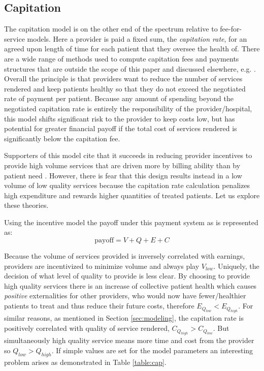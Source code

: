 \documentclass{article}
\begin{document}
\subsection{Capitation} \label{sec:capitation}
The capitation model is on the other end of the spectrum relative to fee-for-service models. Here a provider is paid a fixed sum, the \emph{capitation rate}, for an agreed upon length of time for each patient that they oversee the health of. There are a wide range of methods used to compute capitation fees and payments structures that are outside the scope of this paper and discussed elsewhere, e.g. \cite{capfees}. Overall the principle is that providers want to reduce the number of services rendered and keep patients healthy so that they do not exceed the negotiated rate of payment per patient. Because any amount of spending beyond the negotiated capitation rate is entirely the responsibility of the provider/hospital, this model shifts significant risk to the provider to keep costs low, but has potential for greater financial payoff if the total cost of services rendered is significantly below the capitation fee.

Supporters of this model cite that it succeeds in reducing provider incentives to provide high volume services that are driven more by billing ability than by patient need \cite{blended}. However, there is fear that this design results instead in a low volume of low quality services because the capitation rate calculation penalizes high expenditure and rewards higher quantities of treated patients. Let us explore these theories.

Using the incentive model the payoff under this payment system as is represented as:
\begin{equation} \label{eq:cap}
    \text{payoff} = V + Q + E + C
\end{equation}

Because the volume of services provided is inversely correlated with earnings, providers are incentivized to minimize volume and always play $V_{low}$. Uniquely, the decision of what level of quality to provide is less clear. By choosing to provide high quality services there is an increase of collective patient health which causes \emph{positive} externalities for other providers, who would now have fewer/healthier patients to treat and thus reduce their future costs, therefore $E_{Q_{low}} < E_{Q_{high}}$. For similar reasons, as mentioned in Section \ref{sec:modeling}, the capitation rate is positively correlated with quality of service rendered, $C_{Q_{high}} > C_{Q_{low}}$. But simultaneously high quality service means more time and cost from the provider so $Q_{low} > Q_{high}$. If simple values are set for the model parameters an interesting problem arises as demonstrated in Table \ref{table:cap}.
\end{document}
